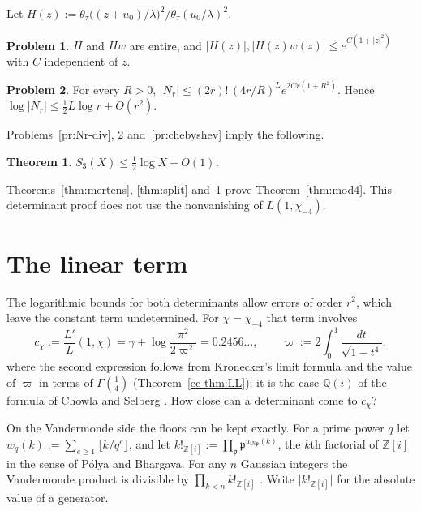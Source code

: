 \documentclass[reqno]{amsart}
\theoremstyle{definition}
\newtheorem{problem}{Problem}[section]
\theoremstyle{plain}
\newtheorem{theorem}{Theorem}[section]
\newcommand{\Z}{\mathbb{Z}}
\newcommand{\Q}{\mathbb{Q}}
\newcommand{\Zi}{\Z[i]}
\begin{document}
Let \(H(z) := \theta_\tau\bigl((z + u_0)/\lambda\bigr)^2 / \theta_\tau(u_0/\lambda)^2\).

\begin{problem}\label{pr:H-growth}
\(H\) and \(Hw\) are entire, and \(\lvert H(z) \rvert, \lvert H(z) w(z) \rvert \le e^{C(1 + \lvert z \rvert^2)}\) with \(C\) independent of \(z\).
\end{problem}

\begin{problem}\label{pr:Nr-size}
For every \(R > 0\), \(\lvert N_r \rvert \le (2r)!\,(4r/R)^L e^{2Cr(1 + R^2)}\).  Hence \(\log \lvert N_r \rvert \le \frac12 L \log r + O(r^2)\).
\end{problem}

Problems~\ref{pr:Nr-div}, \ref{pr:Nr-size} and~\ref{pr:chebyshev} imply the following.

\begin{theorem}\label{thm:inert}
\(S_3(X) \le \frac12 \log X + O(1)\).
\end{theorem}

Theorems~\ref{thm:mertens}, \ref{thm:split} and~\ref{thm:inert} prove Theorem~\ref{thm:mod4}.  This determinant proof does not use the nonvanishing of \(L(1, \chi_{-4})\).

\section{The linear term}\label{sec:linear}

The logarithmic bounds for both determinants allow errors of order \(r^2\), which leave the constant term undetermined.  For \(\chi = \chi_{-4}\) that term involves
\[
  c_\chi := \frac{L'}{L}(1, \chi) = \gamma + \log\frac{\pi^2}{2\varpi^2} = 0.2456\ldots,
  \qquad
  \varpi := 2\int_0^1 \frac{dt}{\sqrt{1 - t^4}},
\]
where the second expression follows from Kronecker's limit formula and the value of \(\varpi\) in terms of \(\Gamma(\frac14)\) (Theorem~\ref{ec-thm:LL}); it is the case \(\Q(i)\) of the formula of Chowla and Selberg \cite{CS}.  How close can a determinant come to \(c_\chi\)?

On the Vandermonde side the floors can be kept exactly.  For a prime power \(q\) let \(w_q(k) := \sum_{e \ge 1} \lfloor k/q^e \rfloor\), and let \(k!_{\Zi} := \prod_{\mathfrak p} \mathfrak p^{w_{N\mathfrak p}(k)}\), the \(k\)th factorial of \(\Zi\) in the sense of Pólya and Bhargava.  For any \(n\) Gaussian integers the Vandermonde product is divisible by \(\prod_{k < n} k!_{\Zi}\) \cite{Bh}.  Write \(\lvert k!_{\Zi} \rvert\) for the absolute value of a generator.
\end{document}
